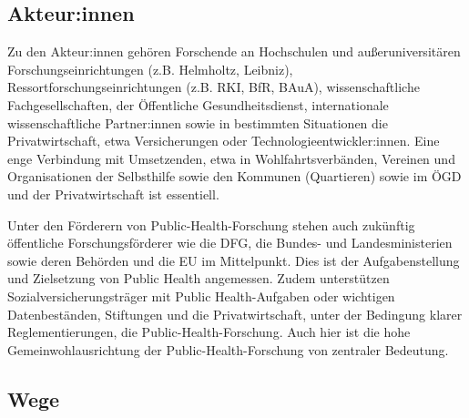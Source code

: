 \documentclass{article}
\begin{document}
\subsection{Akteur:innen}\label{H1066899}



Zu den Akteur:innen gehören Forschende an Hochschulen und außeruniversitären Forschungseinrichtungen (z.B. Helmholtz, Leibniz), Ressortforschungseinrichtungen (z.B. RKI, BfR, BAuA), wissenschaftliche Fachgesellschaften, der Öffentliche Gesundheitsdienst, internationale wissenschaftliche Partner:innen sowie in bestimmten Situationen die Privatwirtschaft, etwa Versicherungen oder Technologieentwickler:innen. Eine enge Verbindung mit Umsetzenden, etwa in Wohlfahrtsverbänden, Vereinen und Organisationen der Selbsthilfe sowie den Kommunen (Quartieren) sowie im ÖGD und der Privatwirtschaft ist essentiell.


Unter den Förderern von Public-Health-Forschung stehen auch zukünftig öffentliche Forschungsförderer wie die DFG, die Bundes- und Landesministerien sowie deren Behörden und die EU im Mittelpunkt. Dies ist der Aufgabenstellung und Zielsetzung von Public Health angemessen. Zudem unterstützen Sozialversicherungsträger mit Public Health-Aufgaben oder wichtigen Datenbeständen, Stiftungen und die Privatwirtschaft, unter der Bedingung klarer Reglementierungen, die Public-Health-Forschung. Auch hier ist die hohe Gemeinwohlausrichtung der Public-Health-Forschung von zentraler Bedeutung.


\subsection{Wege}\label{H6076129}
\end{document}
